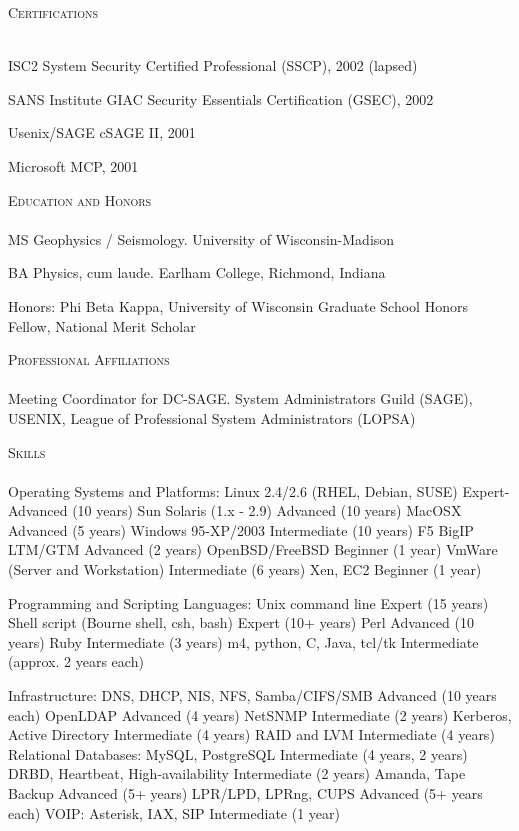 \documentclass{article}
\newcommand{\lineunder}{\vspace*{-8pt} \\ \hspace*{-18pt} \hrulefill \\}
\newcommand{\header}[1]{{\hspace*{-15pt}\vspace*{6pt} \textsc{#1}} \vspace*{-6pt} \lineunder}
\newenvironment{achievements}{\begin{list}{\topsep 0pt \itemsep -2pt}} {\vspace*{4pt}\end{list}}
\begin{document}
\header{Certifications}
\begin{achievements}
\item ISC2 System Security Certified Professional (SSCP), 2002 (lapsed)
\item SANS Institute GIAC Security Essentials Certification (GSEC), 2002
\item Usenix/SAGE cSAGE II, 2001
\item Microsoft MCP, 2001
\end{achievements}


\header{Education and Honors}

MS Geophysics / Seismology.  University of Wisconsin-Madison

BA Physics, cum laude. Earlham College, Richmond, Indiana

Honors: Phi Beta Kappa, University of Wisconsin Graduate School Honors Fellow, National Merit Scholar

\header{Professional Affiliations}
Meeting Coordinator for DC-SAGE.  
System Administrators Guild (SAGE), USENIX, League of Professional System Administrators (LOPSA) 


\header{Skills}
Operating Systems and Platforms: 
   Linux 2.4/2.6 (RHEL, Debian, SUSE)        Expert-Advanced (10 years)
   Sun Solaris (1.x - 2.9)                   Advanced (10 years)
   MacOSX                                    Advanced (5 years)
   Windows 95-XP/2003                        Intermediate (10 years)
   F5 BigIP LTM/GTM                          Advanced (2 years)
   OpenBSD/FreeBSD                           Beginner (1 year)
   VmWare (Server and Workstation)           Intermediate (6 years)
   Xen, EC2                                  Beginner (1 year)
    
Programming and Scripting Languages: 
   Unix command line                         Expert (15 years)
   Shell script (Bourne shell, csh, bash)    Expert (10+ years)
   Perl                                      Advanced (10 years)
   Ruby                                      Intermediate (3 years)
   m4, python, C, Java, tcl/tk               Intermediate (approx. 2 years each)

Infrastructure: 
   DNS, DHCP, NIS, NFS, Samba/CIFS/SMB       Advanced (10 years each)
   OpenLDAP                                  Advanced (4 years)
   NetSNMP                                   Intermediate (2 years)
   Kerberos, Active Directory                Intermediate (4 years)
   RAID and LVM                              Intermediate (4 years)
   Relational Databases: MySQL, PostgreSQL   Intermediate (4 years, 2 years)
   DRBD, Heartbeat, High-availability        Intermediate (2 years)
   Amanda, Tape Backup                       Advanced (5+ years)
   LPR/LPD, LPRng, CUPS                      Advanced (5+ years each)
   VOIP: Asterisk, IAX, SIP                  Intermediate (1 year)
   
\end{document}
